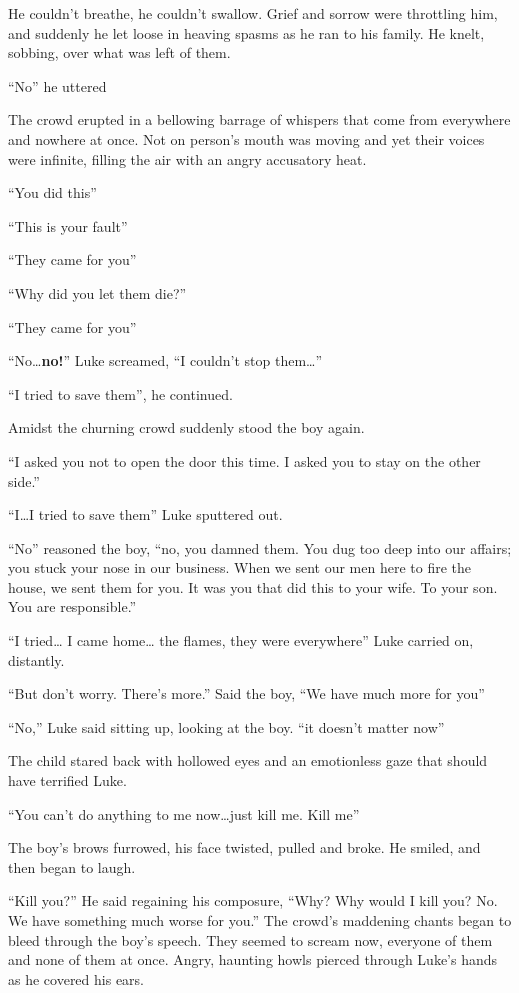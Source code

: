 He couldn't breathe, he couldn't swallow. Grief and sorrow were
throttling him, and suddenly he let loose in heaving spasms as he ran to
his family. He knelt, sobbing, over what was left of them.

``No'' he uttered

The crowd erupted in a bellowing barrage of whispers that come from
everywhere and nowhere at once. Not on person's mouth was moving and
yet their voices were infinite, filling the air with an angry accusatory
heat.

``You did this''

``This is your fault''

``They came for you''

``Why did you let them die?''

``They came for you''

``No\ldots {\bf no!}'' Luke screamed, ``I couldn't stop them\ldots{}''

``I tried to save them'', he continued.

Amidst the churning crowd suddenly stood the boy again.

``I asked you not to open the door this time. I asked you to stay on the
other side.''

``I\ldots I tried to save them'' Luke sputtered out.

``No'' reasoned the boy, ``no, you damned them. You dug too deep into
our affairs; you stuck your nose in our business. When we sent our men
here to fire the house, we sent them for you. It was you that did this
to your wife. To your son. You are responsible.''

``I tried\ldots{} I came home\ldots{} the flames, they were everywhere'' Luke carried
on, distantly.

``But don't worry. There's more.'' Said the boy, ``We have much more
for you''

``No,'' Luke said sitting up, looking at the boy. ``it doesn't matter
now''

The child stared back with hollowed eyes and an emotionless gaze that
should have terrified Luke.

``You can't do anything to me now\ldots just kill me. Kill me''

The boy's brows furrowed, his face twisted, pulled and broke. He
smiled, and then began to laugh.

``Kill you?'' He said regaining his composure, ``Why? Why would I kill
you? No. We have something much worse for you.'' The crowd's maddening
chants began to bleed through the boy's speech. They seemed to scream
now, everyone of them and none of them at once. Angry, haunting howls
pierced through Luke's hands as he covered his ears.

